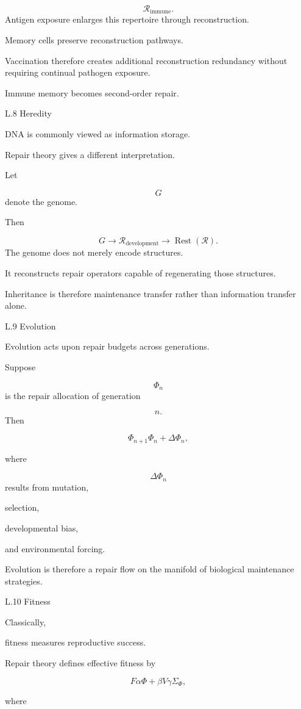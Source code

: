 \documentclass[12pt,oneside]{article}
\theoremstyle{plain}
\theoremstyle{definition}
\theoremstyle{remark}
\DeclareMathOperator{\Rest}{Rest}
\begin{document}
\[
\mathcal R_{\mathrm{immune}}.
\]
Antigen exposure enlarges this repertoire through reconstruction.

Memory cells preserve reconstruction pathways.

Vaccination therefore creates additional reconstruction redundancy without requiring continual pathogen exposure.

Immune memory becomes second-order repair.


L.8 Heredity

DNA is commonly viewed as information storage.

Repair theory gives a different interpretation.

Let

\[
G
\]
denote the genome.

Then

\[
G
\longrightarrow
\mathcal R_{\mathrm{development}}
\longrightarrow
\Rest(\mathcal R).
\]
The genome does not merely encode structures.

It reconstructs repair operators capable of regenerating those structures.

Inheritance is therefore maintenance transfer rather than information transfer alone.


L.9 Evolution

Evolution acts upon repair budgets across generations.

Suppose

\[
\Phi_n
\]
is the repair allocation of generation

\[
n.
\]
Then

\[
\Phi_{n+1}
\Phi_n
+
\Delta\Phi_n,
\]

where

\[
\Delta\Phi_n
\]
results from mutation,

selection,

developmental bias,

and environmental forcing.

Evolution is therefore a repair flow on the manifold of biological maintenance strategies.


L.10 Fitness

Classically,

fitness measures reproductive success.

Repair theory defines effective fitness by

\[
F
\alpha
\Phi
+
\beta
V

\gamma
\Sigma_\Phi,
\]

where
\end{document}
